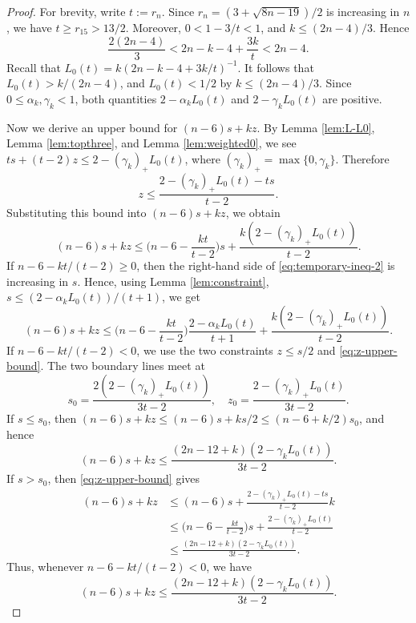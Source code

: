 \documentclass[10pt,a4paper]{amsart}
\begin{document}
\begin{proof}
For brevity, write $t := r_n$. Since
$r_n=(3+\sqrt{8n-19})/2$ is increasing in $n$, we have $t\geq r_{15} > 13/2$.
Moreover, $0<1-3/t<1$, and $k\leq (2n-4)/3$. Hence
\[
 \frac{2(2n-4)}3 < 2n-k-4+\frac{3k}{t} < 2n-4.
\]
Recall that $L_0(t) = k(2n - k - 4 + 3k/t)^{-1}$. It follows that
$L_0(t) > k/(2n-4)$, and $L_0(t) < 1/2$ by $k\leq (2n-4)/3$.
Since $0\leq\alpha_k, \gamma_k<1$, both quantities
$2-\alpha_kL_0(t)$ and $2-\gamma_kL_0(t)$ are positive.

Now we derive an upper bound for $(n-6)s + kz$. By Lemma \ref{lem:L-L0}, Lemma \ref{lem:topthree}, 
and Lemma \ref{lem:weighted0}, we see $ts + (t-2)z\leq 2 - (\gamma_k)_+ L_0(t)$, 
where $(\gamma_k)_+ = \max\{0, \gamma_k\}$. Therefore
\begin{equation}\label{eq:z-upper-bound}
 z\leq\frac{2 - (\gamma_k)_+ L_0(t) - ts}{t - 2}.
\end{equation}
Substituting this bound into $(n-6)s+kz$, we obtain
\begin{equation}\label{eq:temporary-ineq-2}
(n - 6) s + kz
\leq \Big(n - 6 - \frac{kt}{t-2}\Big)s + \frac{k(2 - (\gamma_k)_+ L_0(t))}{t - 2}.
\end{equation}
If $n - 6 - kt/(t-2)\geq 0$, then the right-hand side of \eqref{eq:temporary-ineq-2} is 
increasing in $s$. Hence, using Lemma \ref{lem:constraint}, $s\leq (2-\alpha_k L_0(t))/(t+1)$, we get
\begin{equation}\label{eq:temporary-ineq-(n-6)s}
(n-6)s + kz\leq \Big(n - 6 - \frac{kt}{t-2}\Big)
\frac{2 - \alpha_kL_0(t)}{t+1} + \frac{k(2 - (\gamma_k)_+ L_0(t))}{t-2}.
\end{equation}
If $n - 6 - kt/(t-2) < 0$, we use the two constraints $z\leq s/2$ and \eqref{eq:z-upper-bound}. 
The two boundary lines meet at
\[
 s_0 = \frac{2(2 - (\gamma_k)_+ L_0(t))}{3t-2}, \quad
 z_0 = \frac{2 - (\gamma_k)_+ L_0(t)}{3t - 2}.
\]
If $s \leq s_0$, then $(n-6)s + kz \leq (n-6)s + ks/2 \leq (n - 6 + k/2) s_0$, and hence
\[
(n-6)s + kz \leq \frac{(2n-12+k) (2 - \gamma_kL_0(t))}{3t-2}.
\]
If $s > s_0$, then \eqref{eq:z-upper-bound} gives
\begin{align*}
(n-6)s + kz 
& \leq (n-6)s + \frac{2 - (\gamma_k)_+ L_0(t) - ts}{t-2} k \\
& \leq \Big(n - 6 - \frac{kt}{t-2}\Big) s + \frac{2 - (\gamma_k)_+ L_0(t)}{t - 2} \\
& \leq \frac{(2n-12+k) (2 - \gamma_kL_0(t))}{3t-2}.
\end{align*}
Thus, whenever $n-6-kt/(t-2) < 0$, we have
\begin{equation}\label{eq:temporary-ineq-3}
(n - 6)s + kz\leq\frac{(2n-12+k) (2 - \gamma_kL_0(t))}{3t-2}.
\end{equation}


\end{proof}
\end{document}
